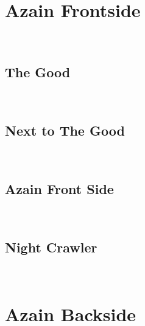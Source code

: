 \section{Azain Frontside}\label{sa:Azain Frontside}
\

\subsection*{The Good}\label{bf:The Good}
\

\subsection*{Next to The Good}\label{bf:Next to The Good}
\

\subsection*{Azain Front Side}\label{bf:Azain Front Side}
\

\subsection*{Night Crawler}\label{bf:Night Crawler}
\

\section{Azain Backside}\label{sa:Azain Backside}
\

\clearpage